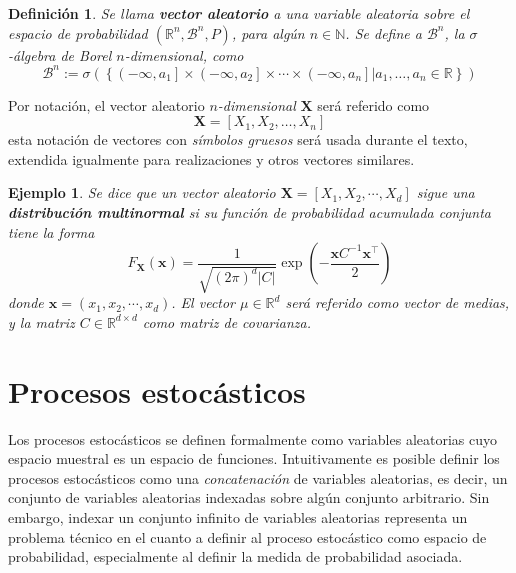 \documentclass[12pt,letterpaper]{book}
\newtheorem{definicion}{Definición}[chapter]
\newtheorem{ejemplo}{Ejemplo}[chapter]
\newcommand{\R}{\mathbb{R}}
\newcommand{\N}{\mathbb{N}}
\newcommand{\abso}[1]{\left| #1 \right|}
\begin{document}
\begin{definicion}
Se llama \textbf{vector aleatorio} a una variable aleatoria sobre el espacio de probabilidad $(\R^{n},\mathcal{B}^{n},P)$, para algún $n\in \N$. Se define a $\mathcal{B}^{n}$, la $\sigma$-álgebra de Borel $n$-dimensional, como
\begin{equation}
\mathcal{B}^{n} := \sigma\left(\left\{ \left(-\infty, a_1\right]\times \left(-\infty, a_2\right]\times \cdots \times \left(-\infty, a_n\right] \lvert a_1, \dots, a_n \in \R \right\}\right)
\end{equation}
\end{definicion}

Por notación, el vector aleatorio \textit{$n$-dimensional} $\boldsymbol{X}$ será referido como
\begin{equation}
\boldsymbol{X} = [X_1, X_2, \dots, X_n]
\end{equation}
esta notación de vectores con \textit{símbolos gruesos} será usada durante el texto, extendida igualmente para realizaciones y otros vectores similares.

\begin{ejemplo}
Se dice que un vector aleatorio $\boldsymbol{X} = [X_1, X_2, \cdots, X_d]$ sigue una \textbf{distribución multinormal} si su función de probabilidad acumulada conjunta tiene la forma
\begin{equation}
F_{\boldsymbol{X}}\left( \boldsymbol{x} \right) = \frac{1}{\sqrt{(2\pi)^{d}\abso{C}}} \exp\left( -\frac{\boldsymbol{x} C^{-1} \boldsymbol{x}^{\intercal} }{2} \right)
\end{equation}
donde $\boldsymbol{x} = (x_1, x_2, \cdots, x_d)$. El vector $\mu \in \R^{d}$ será referido como \textit{vector de medias}, y la matriz $C \in \R^{d\times d}$ como \textit{matriz de covarianza}.
\end{ejemplo}



\section{Procesos estocásticos}

Los procesos estocásticos se definen formalmente como variables aleatorias cuyo espacio muestral es un espacio de funciones.
%
Intuitivamente es posible definir %
los procesos estocásticos como una \textit{concatenación} de variables aleatorias, es decir, un conjunto de variables aleatorias indexadas sobre algún conjunto arbitrario.
%
Sin embargo, indexar un conjunto infinito de variables aleatorias representa un problema técnico en el cuanto a definir al proceso estocástico como espacio de probabilidad, especialmente al definir la medida de probabilidad asociada.
\end{document}
